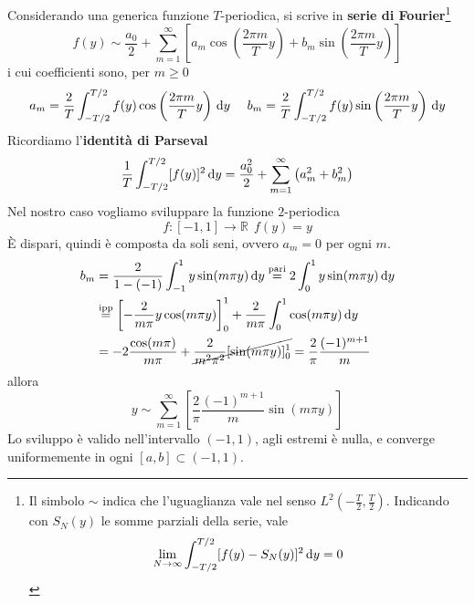 Considerando una generica funzione $T$-periodica, si scrive in \textbf{serie di Fourier}\footnote{Il simbolo $\sim $ indica che l'uguaglianza vale nel senso $L^{2}\left(-\frac{T}{2},\frac{T}{2}\right)$. Indicando con $S_{N}(y)$ le somme parziali della serie, vale
    \begin{equation*}
        \lim _{N\rightarrow \infty }\int ^{T/2}_{-T/2}[ f(y) -S_{N}(y)]^{2} \,\mathrm d y=0
    \end{equation*}}
\begin{equation*}
    f(y) \sim \frac{a_{0}}{2} +\sum\limits ^{\infty }_{m=1}\left[ a_{m}\cos\left(\frac{2\pi m}{T} y\right) +b_{m}\sin\left(\frac{2\pi m}{T} y\right)\right]
\end{equation*}
i cui coefficienti sono, per $m\geq 0$
\begin{equation*}
    a_{m} =\frac{2}{T}\int ^{T/2}_{-T/2} f(y)\cos\left(\frac{2\pi m}{T} y\right) \,\mathrm d y\ \ \ \ b_{m} =\frac{2}{T}\int ^{T/2}_{-T/2} f(y)\sin\left(\frac{2\pi m}{T} y\right) \,\mathrm d y
\end{equation*}
Ricordiamo l'\textbf{identità di Parseval}
\begin{equation*}
    \frac{1}{T}\int ^{T/2}_{-T/2}[ f(y)]^{2} \,\mathrm d y=\frac{a^{2}_{0}}{2} +\sum\limits ^{\infty }_{m=1}\left(a^{2}_{m} +b^{2}_{m}\right)
\end{equation*}
Nel nostro caso vogliamo sviluppare la funzione $2$-periodica
\begin{equation*}
    f:[ -1,1]\rightarrow \mathbb{R} \ \ f(y) =y
\end{equation*}
È dispari, quindi è composta da soli seni, ovvero $a_{m}=0$ per ogni $m$.
\begin{align*}
    b_{m} & = \frac{2}{1-(-1)}\int ^{1}_{-1} y\sin(m\pi y) \,\mathrm d y \overset{\text{pari}}{=}2\int ^{1}_{0} y\sin(m\pi y) \,\mathrm d y               \\
          & \overset{\text{ipp}}{=}\left[ -\frac{2}{m\pi } y\cos(m\pi y)\right]^{1}_{0} +\frac{2}{m\pi }\int ^{1}_{0}\cos(m\pi y) \,\mathrm d y \\
          & =-2\frac{\cos(m\pi)}{m\pi } +\cancel{\frac{2}{m^{2} \pi ^{2}}[\sin(m\pi y)]^{1}_{0}} =\frac{2}{\pi }\frac{(-1)^{m+1}}{m}
\end{align*}
allora
\begin{equation}
    y\sim \sum\limits ^{\infty }_{m=1}\left[\frac{2}{\pi }\frac{(-1)^{m+1}}{m}\sin(m\pi y)\right]
    \label{eq:diff-y-fourier}
\end{equation}
Lo sviluppo è valido nell'intervallo $(-1,1)$, agli estremi è nulla, e converge uniformemente in ogni $[ a,b] \subset (-1,1)$.

